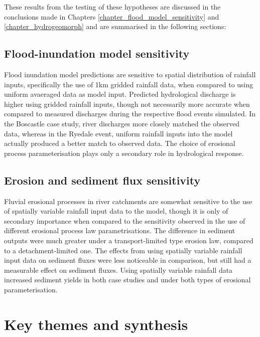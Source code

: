 These results from the testing of these hypotheses are discussed in the conclusions made in Chapters \ref{chapter_flood_model_sensitivity} and \ref{chapter_hydrogeomorph} and are summarised in the following sections:

\subsection{Flood-inundation model sensitivity}
Flood inundation model predictions are sensitive to spatial distribution of rainfall inputs, specifically the use of 1km gridded rainfall data, when compared to using uniform avaeraged data as model input. Predicted hydrological discharge is higher using gridded rainfall inputs, though not necessarily more accurate when compared to measured discharges during the respective flood events simulated. In the Boscastle case study, river discharges more closely matched the observed data, whereas in the Ryedale event, uniform rainfall inputs into the model actually produced a better match to observed data. The choice of erosional process parameterisation plays only a secondary role in hydrological response. 

\subsection{Erosion and sediment flux sensitivity}
Fluvial erosional processes in river catchments are somewhat sensitive to the use of spatially variable rainfall input data to the model, though it is only of secondary importance when compared to the sensitivity observed in the use of different erosional process law parametrisations. The difference in sediment outputs were much greater under a transport-limited type erosion law, compared to a detachment-limited one. The effects from using spatially variable rainfall input data on sediment fluxes were less noticeable in comparison, but still had a measurable effect on sediment fluxes. Using spatially variable rainfall data increased sediment yields in both case studies and under both types of erosional parameterisation.

\section{Key themes and synthesis}

